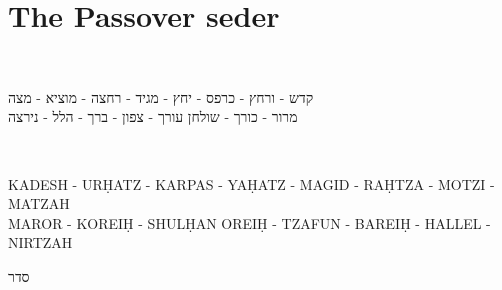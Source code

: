 \documentclass[a4paper,10pt,openany]{memoir}
\newcommand{\hchapter}[1]{
  \begin{hebrew}
    \begin{Spacing}{.97}
      \newpage
      \strut

      \vspace{.15em}

      \noindent\Huge #1

      \vspace{1em}
    \end{Spacing}
  \end{hebrew}
}
\newenvironment{HgTranslit}{\strut\\\noindent\begin{itshape}}{\end{itshape}\vspace{1em}}
\newenvironment{HgHebrew}{\begin{hebrew}\strut\\\noindent\Large}{\end{hebrew}}
\begin{document}
%
%
%

\chapter*{The Passover seder}

\vfill

\vspace{-2em}
\begin{HgHebrew}
  \begin{center}
  קדש 
  -
  ורחץ
  -
  כרפס 
  -
  יחץ 
  -
  מגיד 
  -
  רחצה 
  -
  מוציא
  -
  מצה 
  \\
  מרור 
  -
  כורך 
  -
  שולחן עורך 
  -
  צפון
  -
  ברך 
  -
  הלל 
  -
  נירצה 
  \end{center}
\end{HgHebrew}
\begin{HgTranslit}
  \begin{center}
  {\small 
    KADESH - UR\d{H}ATZ - KARPAS - YA\d{H}ATZ - %
    MAGID - RA\d{H}TZA - MOTZI - MATZAH \\ 
    MAROR - KOREI\d{H} - SHUL\d{H}AN OREI\d{H} - %
    TZAFUN - BAREI\d{H} - HALLEL - NIRTZAH}
  \end{center}
\end{HgTranslit}

\vfill

\hchapter{סדר}
\end{document}
